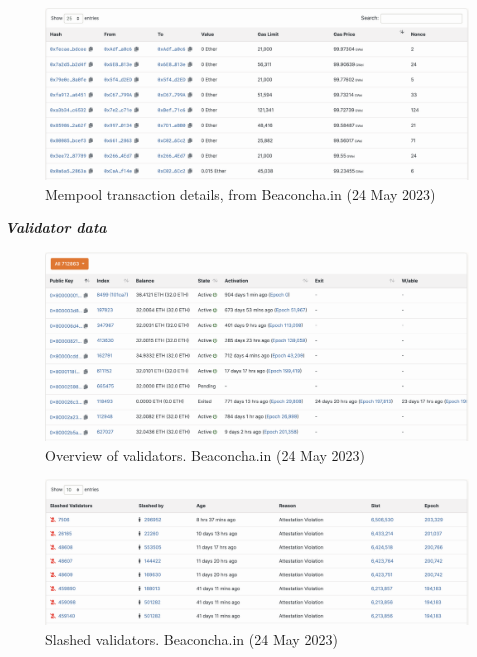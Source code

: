 \documentclass[UTF8]{article}
\begin{document}
\begin{figure}[htbp]
\begin{center}
\includegraphics[width=0.9\linewidth]{images/bmempool}
\caption{Mempool transaction details, from Beaconcha.in (24 May 2023)}
\label{fig:bmempool}
\end{center}
\end{figure}
\clearpage


\textit{\textbf{Validator data}}
\begin{figure}[htbp]
\begin{center}
\includegraphics[width=0.9\linewidth]{images/bvalidators}
\caption{Overview of validators. Beaconcha.in (24 May 2023)}
\label{fig:bvalidators}
\end{center}
\end{figure}

\begin{figure}[htbp]
\begin{center}
\includegraphics[width=0.9\linewidth]{images/bslashed}
\caption{Slashed validators. Beaconcha.in (24 May 2023)}
\label{fig:bslashed}
\end{center}
\end{figure}
\end{document}

